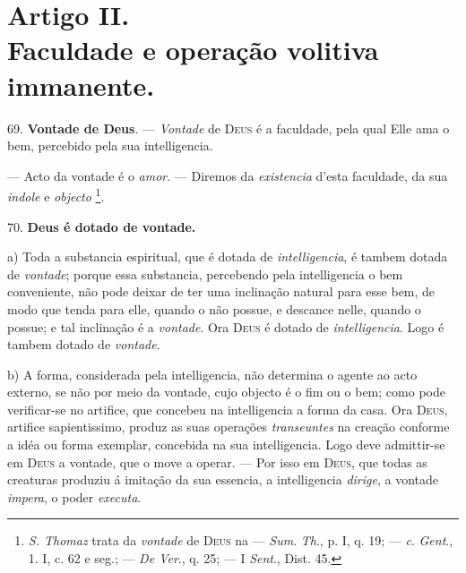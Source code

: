 
\section*{Artigo II.\\ Faculdade e operação volitiva immanente.}

 69. \textbf{Vontade de Deus}. --- \emph{Vontade} de \textsc{Deus} é a faculdade, pela qual Elle ama o bem, percebido pela sua intelligencia.

 --- Acto da vontade é o \emph{amor}. --- Diremos da \emph{existencia} d'esta faculdade, da sua \emph{indole} e \emph{objecto} \footnote{\emph{S. Thomaz} trata da \emph{vontade} de \textsc{Deus} na --- \emph{Sum}. \emph{Th}., p. I, q. 19; --- \emph{c}. \emph{Gent}., 1. I, c. 62 e seg.; --- \emph{De Ver}., q. 25; --- I \emph{Sent}., Dist. 45.}.

70. \textbf{Deus é dotado de vontade.}

a) Toda a substancia espiritual, que é dotada de \emph{intelligencia}, é tambem dotada de \emph{vontade}; porque essa substancia, percebendo pela intelligencia o bem conveniente, não pode deixar de ter uma inclinação natural para esse bem, de modo que tenda para elle, quando o não possue, e descance nelle, quando o possue; e tal inclinação é a \emph{vontade}. Ora \textsc{Deus} é dotado de \emph{intelligencia}. Logo é tambem dotado de \emph{vontade}.

b) A forma, considerada pela intelligencia, não determina o agente ao acto externo, se não por meio da vontade, cujo objecto é o fim ou o bem; como pode verificar-se no artifice, que concebeu na intelligencia a forma da casa. Ora \textsc{Deus}, artifice sapientissimo, produz as suas operações \emph{transeuntes} na creação conforme a idéa ou forma exemplar, concebida na sua intelligencia. Logo deve admittir-se em \textsc{Deus} a vontade, que o move a operar. --- Por isso em \textsc{Deus}, que todas as creaturas produziu á imitação da sua essencia, a intelligencia \emph{dirige}, a vontade \emph{impera}, o poder \emph{executa}.

